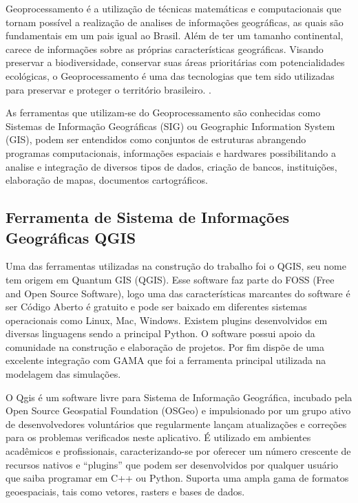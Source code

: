 Geoprocessamento é a utilização de técnicas matemáticas e computacionais que tornam possível a realização de analises de informações geográficas, as quais são fundamentais em um pais igual ao Brasil. Além de ter um tamanho continental, carece de informações sobre as próprias características geográficas. Visando preservar a biodiversidade, conservar suas áreas prioritárias com potencialidades ecológicas, o Geoprocessamento é uma das tecnologias que tem sido utilizadas para preservar e proteger o território brasileiro.\cite{ximenes_modelagem_2008} \cite{georef:online}. 

As ferramentas que utilizam-se do Geoprocessamento são conhecidas como Sistemas de Informação Geográficas (SIG) ou Geographic Information System (GIS), podem ser entendidos como conjuntos de estruturas abrangendo programas computacionais, informações espaciais e hardwares possibilitando a analise e integração de diversos tipos de dados, criação de bancos, instituições, elaboração de mapas, documentos cartográficos\cite{Burrough:online}.




\subsection{Ferramenta de Sistema de Informações Geográficas QGIS}

Uma das ferramentas utilizadas na construção do trabalho foi o QGIS, seu nome tem origem em Quantum GIS (QGIS). Esse software faz parte do FOSS (Free and Open Source Software), logo uma das características marcantes do software é ser Código Aberto é gratuito\cite{Qgis:online} e pode ser baixado em diferentes sistemas operacionais como Linux, Mac, Windows. Existem plugins desenvolvidos em diversas linguagens sendo a principal Python. O software possui apoio da comunidade na construção e elaboração de projetos. Por fim dispõe de uma excelente integração com GAMA que foi a ferramenta principal utilizada na modelagem das simulações. 

O Qgis é um software livre para Sistema de Informação Geográfica, incubado pela Open Source Geospatial Foundation (OSGeo) e impulsionado por um grupo ativo de desenvolvedores voluntários que regularmente lançam atualizações e correções para os problemas verificados neste aplicativo. É utilizado em ambientes acadêmicos e profissionais, caracterizando-se por oferecer um número crescente de recursos nativos e “plugins” que podem ser desenvolvidos por qualquer usuário que saiba programar em C++ ou Python. Suporta uma ampla gama de formatos geoespaciais, tais como vetores, rasters e bases de dados. \cite{bruno2017aplicabilidade}

